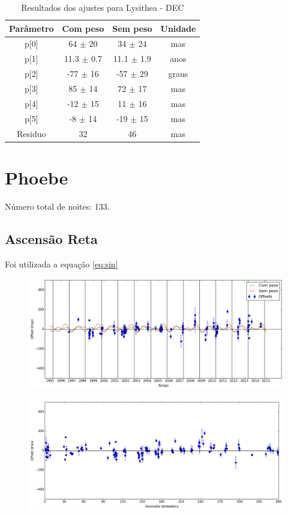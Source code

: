 \documentclass[11pt,a4paper]{report}
\begin{document}
\begin{table}[h!]
\caption{\label{Tab: Lysithea-DEC} Resultados dos ajustes para Lysithea - DEC}
\begin{centering}
\begin{tabular}{cccc}
\hline
\hline
Parâmetro & Com peso & Sem peso & Unidade\tabularnewline
\hline
p[0] & 64 $\pm$ 20 & 34 $\pm$ 24 & mas\\
p[1] & 11.3 $\pm$ 0.7 & 11.1 $\pm$ 1.9 & anos\\
p[2] & -77 $\pm$ 16 & -57 $\pm$ 29 & graus\\
p[3] & 85 $\pm$ 14 & 72 $\pm$ 17 & mas\\
p[4] & -12 $\pm$ 15 & 11 $\pm$ 16 & mas\\
p[5] & -8 $\pm$ 14 & -19 $\pm$ 15 & mas\\
Residuo & 32 & 46 & mas\\
\hline 
\end{tabular} 
\par\end{centering}
\end{table}

\chapter*{Phoebe}

\indent \indent Número total de noites: 133.

\section*{Ascensão Reta}

Foi utilizada a equação \ref{eq:sin}

\begin{figure}[h]
\includegraphics[scale=0.45]{Phoebe/RA.png} 
\end{figure}

\begin{figure}[h]
\includegraphics[scale=0.45]{Phoebe/RA_anom.png}  
\end{figure}
\end{document}
